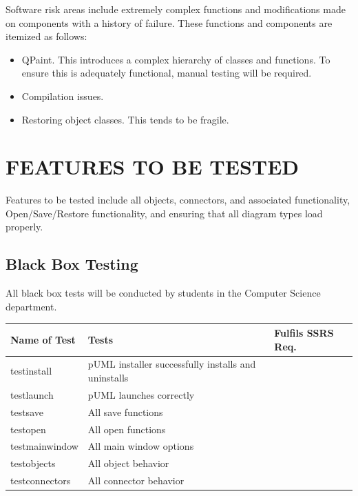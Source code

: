 \documentclass[twoside,letterpaper]{article}
\begin{document}
Software risk areas include extremely complex functions and modifications made on components with a history of failure. These functions and components are itemized as follows: 
\begin{itemize}
\item   QPaint. This introduces a complex hierarchy of classes and functions. To ensure this is adequately functional, manual testing will be required.
\item   Compilation issues.
\item   Restoring object classes. This tends to be fragile.
\end{itemize}


\section[FEATURES TO BE TESTED]{\bfseries FEATURES TO BE TESTED} 

Features to be tested include all objects, connectors, and associated functionality, Open/Save/Restore functionality, and ensuring that all diagram types load properly.

\subsection[]{\bfseries Black Box Testing} 

All black box tests will be conducted by students in the Computer Science department. 

\begin{flushleft}
\tablehead{}
\begin{tabular}{|m{1.5in} m{3.0in} m{2.0in}|}
\hline
{\bfseries\centering Name of Test}
& {\bfseries\centering Tests}
& {\bfseries\centering Fulfils SSRS Req.}
\\\hline
testinstall & pUML installer successfully installs and uninstalls & ~
\\\hline
testlaunch & pUML launches correctly & ~
\\\hline
testsave & All save functions & ~
\\\hline
testopen & All open functions & ~	
\\\hline
testmainwindow & All main window options & ~
\\\hline
testobjects & All object behavior & ~
\\\hline
testconnectors & All connector behavior & ~
\\\hline

\end{tabular}
\end{flushleft}
\bigskip
\end{document}
